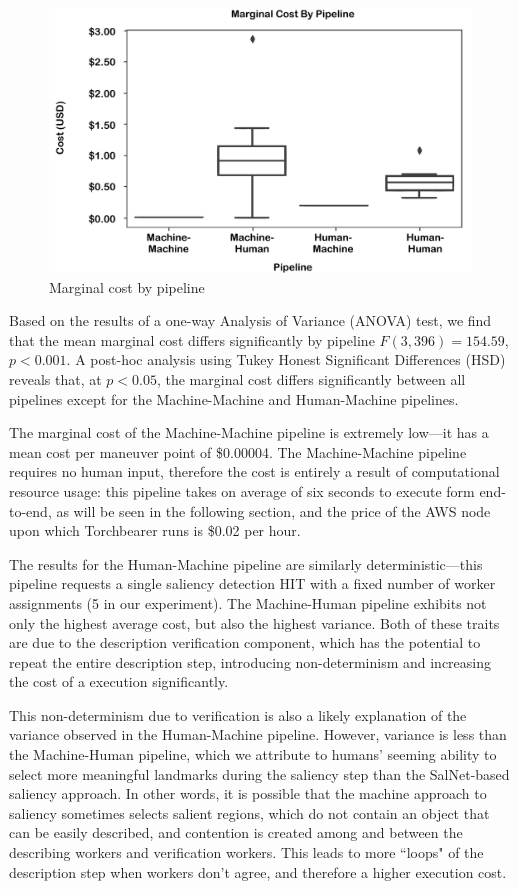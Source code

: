 \begin{figure}[htbp]
  \centering
  \includegraphics[width=\textwidth]{images/plot_cost.pdf}
  \caption{Marginal cost by pipeline}
  \label{fig:plot:cost}
\end{figure}

Based on the results of a one-way Analysis of Variance (ANOVA) test, we find that the mean marginal cost differs significantly by pipeline $F(3, 396)=154.59$, $p < 0.001$. A post-hoc analysis using Tukey Honest Significant Differences (HSD) reveals that, at $p < 0.05$, the marginal cost differs significantly between all pipelines except for the Machine-Machine and Human-Machine pipelines.

The marginal cost of the Machine-Machine pipeline is extremely low---it has a mean cost per maneuver point of \$0.00004. The Machine-Machine pipeline requires no human input, therefore the cost is entirely a result of computational resource usage: this pipeline takes on average of six seconds to execute form end-to-end, as will be seen in the following section, and the price of the AWS node upon which Torchbearer runs is \$0.02 per hour.  

The results for the Human-Machine pipeline are similarly deterministic---this pipeline requests a single saliency detection HIT with a fixed number of worker assignments (5 in our experiment). The Machine-Human pipeline exhibits not only the highest average cost, but also the highest variance. Both of these traits are due to the description verification component, which has the potential to repeat the entire description step, introducing non-determinism and increasing the cost of a execution significantly. 

This non-determinism due to verification is also a likely explanation of the variance observed in the Human-Machine pipeline. However, variance is less than the Machine-Human pipeline, which we attribute to humans' seeming ability to select more meaningful landmarks during the saliency step than the SalNet-based saliency approach. In other words, it is possible that the machine approach to saliency sometimes selects salient regions, which do not contain an object that can be easily described, and contention is created among and between the describing workers and verification workers. This leads to more ``loops" of the description step when workers don't agree, and therefore a higher execution cost.

